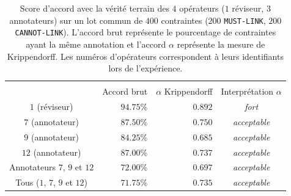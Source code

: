 			\begin{table}[!htb]
				\begin{center}
				\begin{tabular}{|c|r|r|c|}
				
					\hline
					\rowcolor{colorTableHeader!15}
						& \multicolumn{3}{c|}{
							\shortstack{Accord avec la vérité terrain}
						}
						\tabularnewline
						\hhline{|~|---|}
					\rowcolor{colorTableHeader!15}
					\multirow{-2}{*}{Opérateurs}
						& Accord brut
						& $\alpha$ Krippendorff
						& Interprétation $\alpha$
						\tabularnewline
						\hline \hline
					$1$ (réviseur)
						& $94.75$\%
						& $0.892$
						& \textit{fort}
						\tabularnewline
						\hline
					$7$ (annotateur)
						& $87.50$\%
						& $0.750$
						& \textit{acceptable}
						\tabularnewline
						\hline
					$9$ (annotateur)
						& $84.25$\%
						& $0.685$
						& \textit{acceptable}
						\tabularnewline
						\hline
					$12$ (annotateur)
						& $87.00$\%
						& $0.737$
						& \textit{acceptable}
						\tabularnewline
						\hline
					Annotateurs $7$, $9$ et $12$
						& $72.00$\%
						& $0.697$
						& \textit{acceptable}
						\tabularnewline
						\hline
					Tous ($1$, $7$, $9$ et $12$)
						& $71.75$\%
						& $0.735$
						& \textit{acceptable}
						\tabularnewline
						\hline
				\end{tabular}
				\end{center}
				\caption{
					Score d'accord avec la vérité terrain des $4$ opérateurs ($1$ réviseur, $3$ annotateurs) sur un lot commun de $400$ contraintes ($200$ \texttt{MUST-LINK}, $200$ \texttt{CANNOT-LINK}).
					L'accord brut représente le pourcentage de contraintes ayant la même annotation et l'accord $\alpha$ représente la mesure de Krippendorff.
					Les numéros d'opérateurs correspondent à leurs identifiants lors de l'expérience.
				}
				\label{table:4.6.1-ETUDE-ROBUSTESSE-SCORE-ACCORD-VERITE-TERRAIN}
			\end{table}
			
